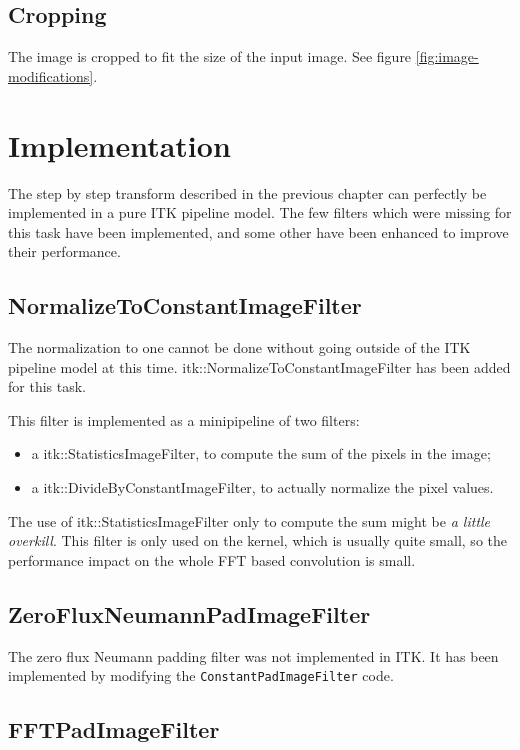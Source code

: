 \documentclass{InsightArticle}
\begin{document}
\subsection{Cropping}

The image is cropped to fit the size of the input image. See figure \ref{fig:image-modifications}.

\section{Implementation}

The step by step transform described in the previous chapter can perfectly be implemented in a pure
ITK pipeline model. The few filters which were missing for this task have been implemented, and some
other have been enhanced to improve their performance.

\subsection{NormalizeToConstantImageFilter}

The normalization to one cannot be done without going outside of the ITK pipeline model at this time.
itk::NormalizeToConstantImageFilter has been added for this task.

This filter is implemented as a minipipeline of two filters:
\begin{itemize}
  \item a itk::StatisticsImageFilter, to compute the sum of the pixels in the image;
  \item a itk::DivideByConstantImageFilter, to actually normalize the pixel values.
\end{itemize}
The use of itk::StatisticsImageFilter only to compute the sum might be {\em a little overkill}. This filter
is only used on the kernel, which is usually quite small, so the performance impact on the whole
FFT based convolution is small.

\subsection{ZeroFluxNeumannPadImageFilter}

The zero flux Neumann padding filter was not implemented in ITK. It has been implemented by modifying
the \verb$ConstantPadImageFilter$ code.

\subsection{FFTPadImageFilter}
\end{document}
